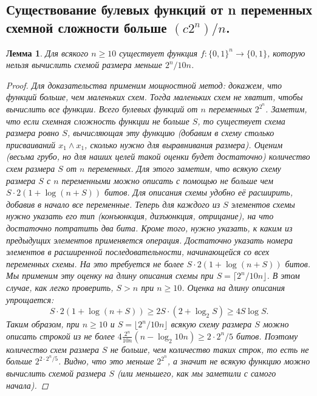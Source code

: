 \documentclass{article}
\newtheorem{lemma}{Лемма}
\begin{document}
\subsection{Существование булевых функций от n переменных схемной сложности больше $(c2^n)/n$.}
\begin{lemma}
Для всякого $n \geqslant 10$ существует функция $ f : \{0, 1\}^n \to \{0, 1\}$, которую нельзя вычислить схемой размера меньше $2^n/10n$.
\begin{proof}
Для доказательства применим мощностной метод: докажем, что функций больше, чем маленьких схем. Тогда маленьких схем не хватит, чтобы вычислить все функции.
\newline
Всего булевых функций от $n$ переменных $2^{2^n}$.
\newline
Заметим, что если схемная сложность функции не больше $S$, то существует схема размера ровно $S$, вычисляющая эту функцию (добавим в схему столько присваиваний $x_1 \wedge x_1$, сколько нужно для выравнивания размера).
\newline
Оценим (весьма грубо, но для наших целей такой оценки будет достаточно) количество схем размера $S$ от $n$ переменных. Для этого заметим, что всякую схему размера $S$ с $n$ переменными можно описать с помощью не больше чем $S \cdot 2(1+\log(n+S))$ битов. Для описания схемы удобно её расширить, добавив в начало все переменные.
\newline
Теперь для каждого из $S$ элементов схемы нужно указать его тип (конъюнкция, дизъюнкция, отрицание), на что достаточно потратить два бита. Кроме того, нужно указать, к каким из предыдущих элементов применяется операция. Достаточно указать номера элементов в расширенной последовательности, начинающейся со всех переменных схемы. На это требуется не более $S·2(1+\log(n+S))$ битов.
\newline
Мы применим эту оценку на длину описания схемы при $S = \lceil 2^n/10n \rfloor$. В этом случае, как легко проверить, $S > n$ при $n \geqslant 10$. Оценка на длину описания упрощается:
\[
S \cdot 2(1 + \log(n + S)) \geqslant 2S \cdot (2 + \log_2{S})
\geqslant 4S \log{S}.
\]
Таким образом, при $n \geqslant 10$ и $S = \lfloor 2^n/10n \rfloor$ всякую схему размера $S$ можно описать строкой из не более \(
4 \frac{2^n}{10n} (n - \log_2{10n})
\geqslant
2 \cdot 2^n / 5
\) битов. Поэтому количество схем размера $S$ не больше, чем количество таких строк, то есть не больше $2^{2 \cdot 2^n / 5}$. Видно, что это меньше $2^{2^n}$, а значит не всякую функцию можно вычислить схемой размера $S$ (или меньшего, как мы заметили с самого начала).
\end{proof}
\end{lemma}
\end{document}
